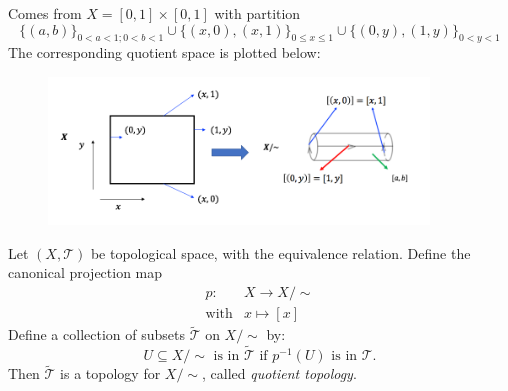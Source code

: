 \begin{example}
Comes from $X=[0,1]\times[0,1]$ with partition 
\[
\{(a,b)\}_{0<a<1;0<b<1}\cup\{(x,0),(x,1)\}_{0\le x\le 1}
\cup\{(0,y),(1,y)\}_{0< y< 1}
\]
The corresponding quotient space is plotted below:
\begin{figure}[H]
\centering
\includegraphics[width=0.9\textwidth]{week5/p_8}
\end{figure}
\end{example}

\begin{proposition}
Let $(X,\mathcal{T})$ be topological space, with the equivalence relation.
Define the canonical projection map
\[
\begin{array}{ll}
p:&X\to X/\sim\\
\text{with}&x\mapsto[x]
\end{array}
\]
Define a collection of subsets $\tilde{\mathcal{T}}$ on $X/\sim$ by:
\[
\text{$U\subseteq X/\sim$ is in $\tilde{\mathcal{T}}$ if $p^{-1}(U)$ is in $\mathcal{T}.$}
\]
Then $\tilde{\mathcal{T}}$ is a topology for $X/\sim$, called \emph{quotient topology}.
\end{proposition}



























